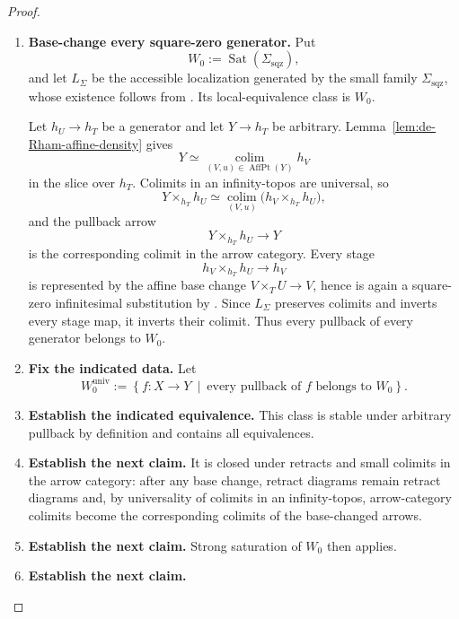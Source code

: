 \begin{proof}
\leavevmode
\begin{enumerate}[label=\textup{(\arabic*)}]
    \item \textbf{Base-change every square-zero generator.}
    Put
    \[
    W_0:=\operatorname{Sat}(\Sigma_{\mathrm{sqz}}),
    \]
    and let \(L_\Sigma\) be the accessible localization generated by the small
    family \(\Sigma_{\mathrm{sqz}}\), whose existence follows from
    \cite[Proposition~5.5.4.15]{LurieHigherToposTheory}. Its
    local-equivalence class is \(W_0\).

    Let \(h_U\to h_T\) be a generator and let \(Y\to h_T\) be arbitrary.
    Lemma~\ref{lem:de-Rham-affine-density} gives
    \[
    Y\simeq
    \operatorname*{colim}_{(V,u)\in\operatorname{AffPt}(Y)}h_V
    \]
    in the slice over \(h_T\). Colimits in an infinity-topos are universal, so
    \[
    Y\times_{h_T}h_U
    \simeq
    \operatorname*{colim}_{(V,u)}
    \bigl(h_V\times_{h_T}h_U\bigr),
    \]
    and the pullback arrow
    \[
    Y\times_{h_T}h_U\longrightarrow Y
    \]
    is the corresponding colimit in the arrow category. Every stage
    \[
    h_V\times_{h_T}h_U\longrightarrow h_V
    \]
    is represented by the affine base change \(V\times_TU\to V\), hence is again
    a square-zero infinitesimal substitution by
    . Since \(L_\Sigma\) preserves
    colimits and inverts every stage map, it inverts their colimit. Thus every
    pullback of every generator belongs to \(W_0\).
    \item \textbf{Fix the indicated data.}
    Let
    \[
    W_0^{\mathrm{univ}}
    :=
    \left\{
    f:X\to Y
    \ \middle|\
    \text{every pullback of \(f\) belongs to \(W_0\)}
    \right\}.
    \]
    \item \textbf{Establish the indicated equivalence.}
    This class is stable under arbitrary pullback by definition and contains all
    equivalences.
    \item \textbf{Establish the next claim.}
    It is closed under retracts and small colimits in the arrow
    category: after any base change, retract diagrams remain retract diagrams and,
    by universality of colimits in an infinity-topos, arrow-category colimits
    become the corresponding colimits of the base-changed arrows.
    \item \textbf{Establish the next claim.}
    Strong
    saturation of \(W_0\) then applies.
    \item \textbf{Establish the next claim.}

\end{enumerate}
\end{proof}

